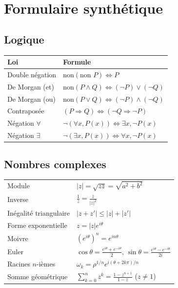 \appendix
\chapter{Formulaire synthétique}

\section{Logique}

\begin{center}
\renewcommand{\arraystretch}{1.4}
\begin{tabular}{|l|l|}
\hline
\textbf{Loi} & \textbf{Formule} \\
\hline
Double négation & $\text{non}(\text{non } P) \Leftrightarrow P$ \\
De Morgan (et) & $\text{non}(P \wedge Q) \Leftrightarrow (\neg P) \vee (\neg Q)$ \\
De Morgan (ou) & $\text{non}(P \vee Q) \Leftrightarrow (\neg P) \wedge (\neg Q)$ \\
Contraposée & $(P \Rightarrow Q) \Leftrightarrow (\neg Q \Rightarrow \neg P)$ \\
Négation $\forall$ & $\neg(\forall x, P(x)) \Leftrightarrow \exists x, \neg P(x)$ \\
Négation $\exists$ & $\neg(\exists x, P(x)) \Leftrightarrow \forall x, \neg P(x)$ \\
\hline
\end{tabular}
\end{center}

\section{Nombres complexes}

\begin{center}
\renewcommand{\arraystretch}{1.4}
\begin{tabular}{|l|l|}
\hline
Module & $|z| = \sqrt{z\bar{z}} = \sqrt{a^2 + b^2}$ \\
Inverse & $\frac{1}{z} = \frac{\bar{z}}{|z|^2}$ \\
Inégalité triangulaire & $|z + z'| \leqslant |z| + |z'|$ \\
Forme exponentielle & $z = |z| e^{i\theta}$ \\
Moivre & $(e^{i\theta})^n = e^{in\theta}$ \\
Euler & $\cos\theta = \frac{e^{i\theta}+e^{-i\theta}}{2}$, \; $\sin\theta = \frac{e^{i\theta}-e^{-i\theta}}{2i}$ \\
Racines $n$-ièmes & $\omega_k = \rho^{1/n} e^{i(\theta + 2k\pi)/n}$ \\
Somme géométrique & $\sum_{k=0}^n z^k = \frac{1-z^{n+1}}{1-z}$ \; ($z \neq 1$) \\
\hline
\end{tabular}
\end{center}


